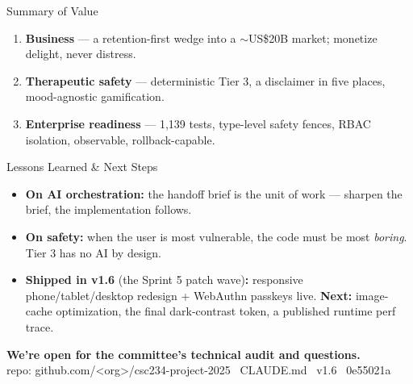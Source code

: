 \documentclass[aspectratio=169,11pt]{beamer}
\begin{document}

\begin{frame}{Summary of Value}
  \begin{enumerate}
    \item \textbf{Business} --- a retention-first wedge into a $\sim$US\$20B market; monetize delight, never distress.
    \item \textbf{Therapeutic safety} --- deterministic Tier 3, a disclaimer in five places, mood-agnostic gamification.
    \item \textbf{Enterprise readiness} --- 1{,}139 tests, type-level safety fences, RBAC isolation, observable, rollback-capable.
  \end{enumerate}
  \vfill
\end{frame}

\begin{frame}{Lessons Learned \& Next Steps}
  \begin{itemize}
    \item \textbf{On AI orchestration:} the handoff brief is the unit of work --- sharpen the brief, the implementation follows.
    \item \textbf{On safety:} when the user is most vulnerable, the code must be most \emph{boring}. Tier 3 has no AI by design.
    \item \textbf{Shipped in v1.6} (the Sprint 5 patch wave)\textbf{:} responsive phone/tablet/desktop redesign + WebAuthn passkeys live. \textbf{Next:} image-cache optimization, the final dark-contrast token, a published runtime perf trace.
  \end{itemize}
  \vfill
  \centering
  {\color{moodgreendark}\textbf{We're open for the committee's technical audit and questions.}}\\[0.5em]
  {\footnotesize\ttfamily repo: github.com/<org>/csc234-project-2025 \textperiodcentered\ CLAUDE.md \textperiodcentered\ v1.6 \textperiodcentered\ 0e55021a}
\end{frame}
\end{document}
